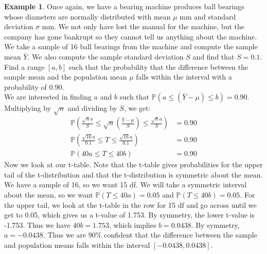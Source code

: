 \documentclass[12pt]{article}
\theoremstyle{definition}
\newtheorem*{example}{Example}
\theoremstyle{remark}
\def\P{{\mathbb P}}
\begin{document}
\begin{example}Once again, we have a bearing machine produces ball bearings whose diameters are normally distributed with mean $
\mu$ mm and standard deviation $\sigma$ mm. We not only have lost the manual for the machine, but the company has gone bankrupt so they cannot tell us anything about the machine. We take a sample of 16 ball bearings from the machine and compute the sample mean $\bar{Y}$. We also compute the sample standard deviation $S$ and find that $S = 0.1$. Find a range $[a, b]$ such that the probability that the difference between the sample mean and the population mean $\mu$ falls within the interval with a probability of 0.90.\\

We are interested in finding $a$ and $b$ such that $\P(a \leq (\bar{Y} - \mu) \leq b) = 0.90$. Multiplying by $\sqrt{n}$ and dividing by $S$, we get:
\begin{align*}
\P\left( \frac{\sqrt{n}a}{S} \leq \sqrt{n} \left(\frac{\bar{Y} - \mu}{ S }\right) \leq \frac{\sqrt{n}a}{S} \right) &= 0.90\\
\P\left( \frac{\sqrt{16}a}{0.1} \leq T \leq \frac{\sqrt{16}a}{0.1} \right) &= 0.90 \\
\P\left( 40a \leq T \leq 40b  \right) &= 0.90 
\end{align*}
Now we look at our t-table. Note that the t-table gives probabilities for the upper tail of the t-distribution and that the t-distribution is symmetric about the mean. We have a sample of 16, so we want 15 df. We will take a symmetric interval about the mean, so we want $\P(T \leq 40a) = 0.05$ and $\P(T \leq 40b) = 0.05$. For the upper tail, we look at the t-table in the row for 15 df and go across until we get to 0.05, which gives us a t-value of 1.753. By symmetry, the lower t-value is -1.753. Thus we have $40b = 1.753$, which implies $b = 0.0438$. By symmetry, $a = -0.0438$. Thus we are 90\% confident that the difference between the sample and population means falls within the interval $[-0.0438, 0.0438]$.\\


\end{example}
\end{document}
